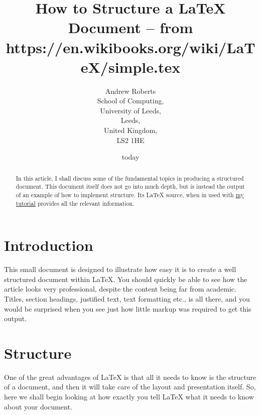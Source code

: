 \documentclass{article}
\begin{document}
\title{How to Structure a LaTeX Document -- from https://en.wikibooks.org/wiki/LaTeX/simple.tex} %
\author{Andrew Roberts\\
        School of Computing,\\
		University of Leeds,\\
		Leeds,\\
		United Kingdom,\\
		LS2 1HE\\
		}  %
\date{today}  %
\maketitle

\begin{abstract}
In this article, I shall discuss some of the fundamental topics in
producing a structured document.  This document itself does not go into
much depth, but is instead the output of an example of how to implement
structure. Its \LaTeX{} source, when in used with \href{http://www.comp.leeds.ac.uk/andyr/misc/latex/latextutorial2.html}{my tutorial}
provides all the relevant information.  \end{abstract}

\section{Introduction}
This small document is designed to illustrate how easy it is to create a
well structured document within \LaTeX\cite{lamport94}.  You should quickly be able to
see how the article looks very professional, despite the content being
far from academic.  Titles, section headings, justified text, text
formatting etc., is all there, and you would be surprised when you see
just how little markup was required to get this output.

\section{Structure}
One of the great advantages of \LaTeX{} is that all it needs to know is
the structure of a document, and then it will take care of the layout
and presentation itself.  So, here we shall begin looking at how exactly
you tell \LaTeX{} what it needs to know about your document.
\end{document}
